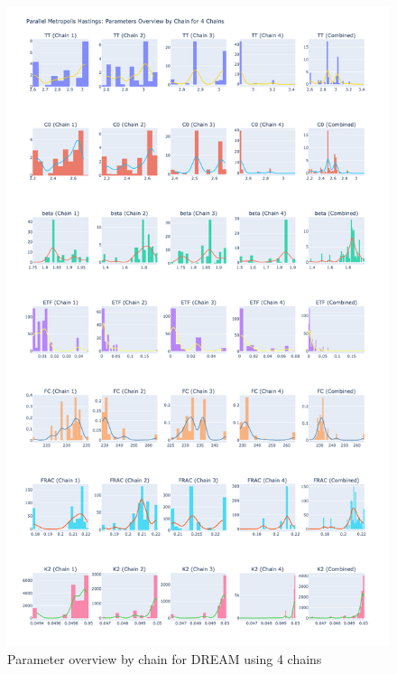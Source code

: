 \begin{figure}[H]
    \centering
    \includegraphics[width=1\textwidth]{figures/dream/param_overview_4.png}
    \captionsetup{width=.8\textwidth}
    \caption{Parameter overview by chain for DREAM using 4 chains}
    \label{fig:enter-label}
\end{figure}

